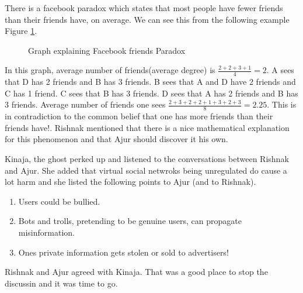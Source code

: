  There is a facebook paradox which states that most people have fewer friends than their friends have, on average. We can see this from the following example Figure \ref{21g1}.
 \begin{figure}
\begin{center}
\caption{ Graph explaining Facebook friends Paradox}\label{21g1}
\end{center}
\end{figure}

In this graph, average number of friends(average degree) is $\frac{2+2+3+1}{4}=2$.  A sees that D has 2 friends and B has 3 friends. B sees that A and D have 2 friends and C has 1 friend. C sees that B has 3 friends. D sees that A has 2 friends and B has 3 friends. Average number of friends one sees 
$\frac{2+3+2+2+1+3+2+3}{8}=2.25$. This is in contradiction to the common belief that one has more friends than their friends have!. Rishnak mentioned that there is a nice mathematical explanation for this phenomenon and that Ajur should discover it his own.

Kinaja, the ghost perked up and listened to the conversations between Rishnak and Ajur. She added that virtual social netwroks being unregulated do cause a lot harm and she listed the following points to Ajur (and to Rishnak).
\begin{enumerate}
    \item Users could be bullied.
    \item  Bots and trolls, pretending to be genuine users,  can propagate misinformation.
    \item  Ones private information gets stolen or sold to advertisers!
\end{enumerate}

Rishnak and Ajur agreed with Kinaja. That was a good place to stop the discussin and it was time to go.